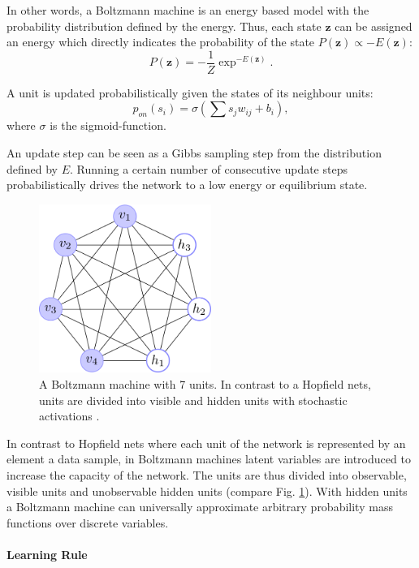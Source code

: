 In other words, a Boltzmann machine is an energy based model with the probability distribution defined by the energy.
Thus, each state $\textbf{z}$ can be assigned an energy which directly indicates the probability of the state $P(\textbf{z}) \propto -E(\textbf{z})$:
\[
P(\textbf{z}) = - \frac{1}{Z} \exp^{-E(\textbf{z})} .
\]

A unit is updated probabilistically given the states of its neighbour units:
\[
p_{on}(s_i) = \sigma( \sum s_j w_{ij} + b_i ), 
\]
where $\sigma$ is the sigmoid-function.

An update step can be seen as a Gibbs sampling step from the distribution defined by $E$.
Running a certain number of consecutive update steps probabilistically drives the network to a low energy or equilibrium state.


\begin{figure}
	\centering
    	\includegraphics[width=0.5\textwidth]{imgs/bm.png} 
    \caption[A Boltzmann machine with 7 units.]{A Boltzmann machine with 7 units. In contrast to a Hopfield nets, units are divided into visible and hidden units with stochastic activations \cite{boltzImg}.}
	\label{fig:bm}
\end{figure}

In contrast to Hopfield nets where each unit of the network is represented by an element a data sample, in Boltzmann machines latent variables are introduced to increase the capacity of the network.
The units are thus divided into observable, visible units and unobservable hidden units (compare Fig. \ref{fig:bm}).
With hidden units a Boltzmann machine can universally approximate arbitrary probability mass functions over discrete variables.


\paragraph{Learning Rule} \label{c:cd}

